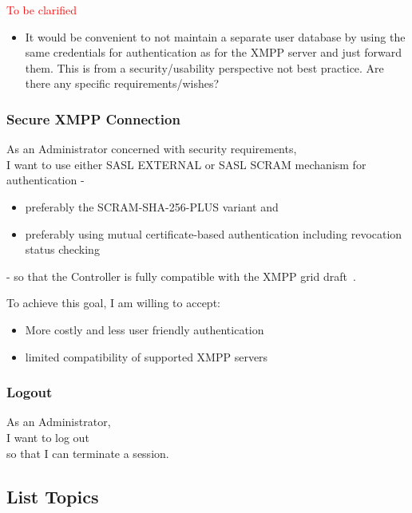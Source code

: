 \noindent\textcolor{red}{To be clarified}

\begin{itemize}
    \item It would be convenient to not maintain a separate user database by using the same credentials for authentication
            as for the XMPP server and just forward them. This is from a security/usability perspective not best practice.
            Are there any specific requirements/wishes?
\end{itemize}

\subsubsection{Secure XMPP Connection}

As an Administrator concerned with security requirements,\\
I want to use either SASL EXTERNAL or SASL SCRAM mechanism for authentication -

\begin{itemize}
    \item preferably the SCRAM-SHA-256-PLUS variant and
    \item preferably using mutual certificate-based authentication including revocation status checking
\end{itemize}

\noindent - so that the Controller is fully compatible with the XMPP grid draft~\cite{ietf-mile-xmpp-grid-05}.

\noindent To achieve this goal, I am willing to accept:
\begin{itemize}
    \item More costly and less user friendly authentication
    \item limited compatibility of supported XMPP servers
\end{itemize}

\subsubsection{Logout}

As an Administrator,\\
I want to log out\\
so that I can terminate a session.

\subsection{List Topics}

